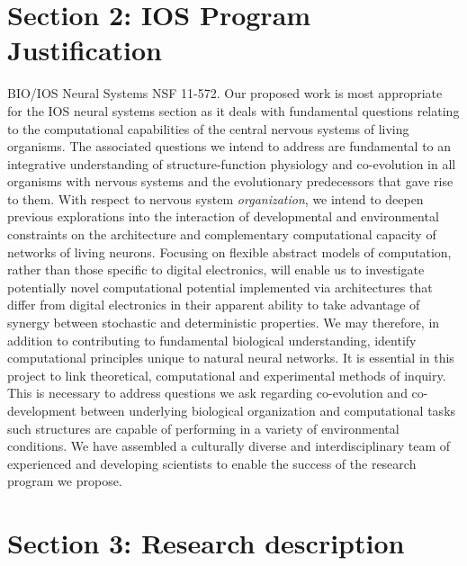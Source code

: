\section{Section 2: IOS Program Justification}
\label{sec:justification}
\noindent BIO/IOS Neural Systems NSF 11-572. Our proposed work is most appropriate for the IOS neural systems section as it deals with fundamental questions relating to the computational capabilities of the central nervous systems of living organisms. The associated questions we intend to address are fundamental to an integrative understanding of structure-function physiology and co-evolution in all organisms with nervous systems and the evolutionary predecessors that gave rise to them. With respect to nervous system \emph{organization}, we intend to deepen previous explorations into the interaction of developmental and environmental constraints on the architecture and complementary computational capacity of networks of living neurons. Focusing on flexible abstract models of computation, rather than those specific to digital electronics, will enable us to investigate potentially novel computational potential implemented via architectures that differ from digital electronics in their apparent ability to take advantage of synergy between stochastic and deterministic properties. We may therefore, in addition to contributing to fundamental biological understanding, identify computational principles unique to natural neural networks. It is essential in this project to link theoretical, computational and experimental methods of inquiry. This is necessary to address questions we ask regarding co-evolution and co-development between underlying biological organization and computational tasks such structures are capable of performing in a variety of environmental conditions. We have assembled a culturally diverse and interdisciplinary team of experienced and developing scientists to enable the success of the research program we propose.

\section{Section 3: Research description}

